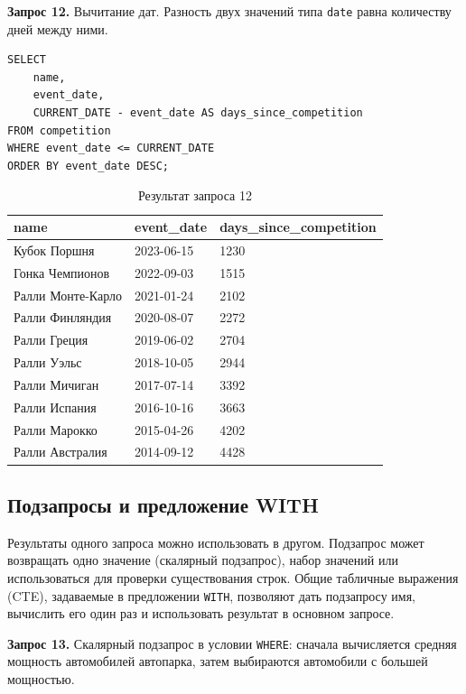 \documentclass[oneside,a4paper,14pt]{extarticle}
\begin{document}
\textbf{Запрос 12.} Вычитание дат. Разность двух значений типа \texttt{date} равна количеству дней между ними.

\begin{verbatim}
SELECT
    name,
    event_date,
    CURRENT_DATE - event_date AS days_since_competition
FROM competition
WHERE event_date <= CURRENT_DATE
ORDER BY event_date DESC;
\end{verbatim}

\begin{table}[H]
\centering
\footnotesize

\caption{Результат запроса 12}\label{tab:infun7}
\begin{tabular}{|l|l|l|}
\hline
\textbf{name} & \textbf{event\_\allowbreak date} & \textbf{days\_\allowbreak since\_\allowbreak competition} \\ \hline
Кубок Поршня & 2023-06-15 & 1230 \\ \hline
Гонка Чемпионов & 2022-09-03 & 1515 \\ \hline
Ралли Монте-Карло & 2021-01-24 & 2102 \\ \hline
Ралли Финляндия & 2020-08-07 & 2272 \\ \hline
Ралли Греция & 2019-06-02 & 2704 \\ \hline
Ралли Уэльс & 2018-10-05 & 2944 \\ \hline
Ралли Мичиган & 2017-07-14 & 3392 \\ \hline
Ралли Испания & 2016-10-16 & 3663 \\ \hline
Ралли Марокко & 2015-04-26 & 4202 \\ \hline
Ралли Австралия & 2014-09-12 & 4428 \\ \hline
\end{tabular}
\end{table}


\subsection{Подзапросы и предложение WITH}

Результаты одного запроса можно использовать в другом. Подзапрос может возвращать одно значение (скалярный подзапрос), набор значений или использоваться для проверки существования строк. Общие табличные выражения (CTE), задаваемые в предложении \texttt{WITH}, позволяют дать подзапросу имя, вычислить его один раз и использовать результат в основном запросе.

\textbf{Запрос 13.} Скалярный подзапрос в условии \texttt{WHERE}: сначала вычисляется средняя мощность автомобилей автопарка, затем выбираются автомобили с большей мощностью.
\end{document}
